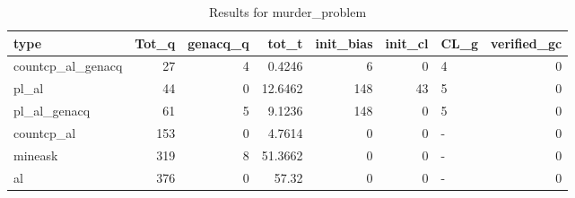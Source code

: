 \begin{table}[ht]
\caption{Results for murder_problem}
\begin{tabular}{lrrrrrlr}
\hline
 type              &   Tot\_q &   genacq\_q &   tot\_t &   init\_bias &   init\_cl & CL\_g   &   verified\_gc \\
\hline
 countcp\_al\_genacq &      27 &          4 &  0.4246 &           6 &         0 & 4      &             0 \\
 pl\_al             &      44 &          0 & 12.6462 &         148 &        43 & 5      &             0 \\
 pl\_al\_genacq      &      61 &          5 &  9.1236 &         148 &         0 & 5      &             0 \\
 countcp\_al        &     153 &          0 &  4.7614 &           0 &         0 & -      &             0 \\
 mineask           &     319 &          8 & 51.3662 &           0 &         0 & -      &             0 \\
 al                &     376 &          0 & 57.32   &           0 &         0 & -      &             0 \\
\hline
\end{tabular}
\end{table}